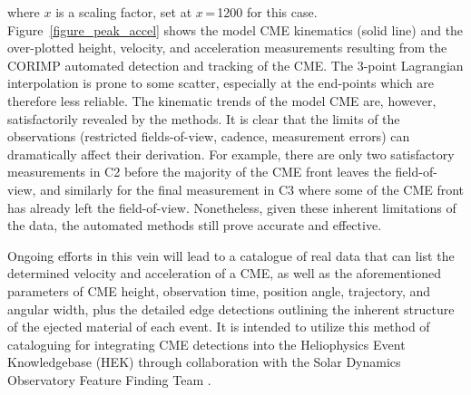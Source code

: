 \documentclass[preprint2]{aastex}
\begin{document}
where $x$ is a scaling factor, set at $x$\,=\,1200 for this case. Figure~\ref{figure_peak_accel} shows the model CME kinematics (solid line) and the over-plotted height, velocity, and acceleration measurements resulting from the CORIMP automated detection and tracking of the CME. The 3-point Lagrangian interpolation is prone to some scatter, especially at the end-points which are therefore less reliable. The kinematic trends of the model CME are, however, satisfactorily revealed by the methods. It is clear that the limits of the observations (restricted fields-of-view, cadence, measurement errors) can dramatically affect their derivation. For example, there are only two satisfactory measurements in C2 before the majority of the CME front leaves the field-of-view, and similarly for the final measurement in C3 where some of the CME front has already left the field-of-view. Nonetheless, given these inherent limitations of the data, the automated methods still prove accurate and effective. 

Ongoing efforts in this vein will lead to a catalogue of real data that can list the determined velocity and acceleration of a CME, as well as the aforementioned parameters of CME height, observation time, position angle, trajectory, and angular width, plus the detailed edge detections outlining the inherent structure of the ejected material of each event. It is intended to utilize this method of cataloguing for integrating CME detections into the Heliophysics Event Knowledgebase (HEK) through collaboration with the Solar Dynamics Observatory Feature Finding Team \citep[SDO FFT;][]{2011SoPh..tmp..144M}.
\end{document}
